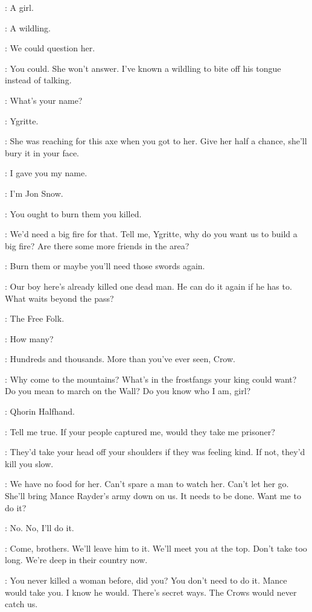 \JON: A girl. 

\HALFHAND: A wildling. 

\JON: We could question her. 

\HALFHAND: You could. She won't answer. I've known a wildling to bite off his tongue instead of talking. 

\JON: What's your name? 

\YGRITTE: Ygritte. 

\HALFHAND: She was reaching for this axe when you got to her. Give her half a chance, she'll bury it in your face. 

\YGRITTE: I gave you my name. 

\JON: I'm Jon Snow. 

\YGRITTE: You ought to burn them you killed. 

\HALFHAND: We'd need a big fire for that. Tell me, Ygritte, why do you want us to build a big fire? Are there some more friends in the area? 

\YGRITTE: Burn them or maybe you'll need those swords again. 

\HALFHAND: Our boy here's already killed one dead man. He can do it again if he has to. What waits beyond the pass? 

\YGRITTE: The Free Folk. 

\HALFHAND: How many? 

\YGRITTE: Hundreds and thousands. More than you've ever seen, Crow. 

\HALFHAND: Why come to the mountains? What's in the frostfangs your king could want? Do you mean to march on the Wall? Do you know who I am, girl? 

\YGRITTE: Qhorin Halfhand. 

\HALFHAND: Tell me true. If your people captured me, would they take me prisoner? 

\YGRITTE: They'd take your head off your shoulders if they was feeling kind. If not, they'd kill you slow. 

\HALFHAND: We have no food for her. Can't spare a man to watch her. Can't let her go. She'll bring Mance Rayder's army down on us. It needs to be done. Want me to do it? 

\JON: No. No, I'll do it. 

\HALFHAND: Come, brothers. We'll leave him to it. We'll meet you at the top. Don't take too long. We're deep in their country now. 


\YGRITTE: You never killed a woman before, did you? You don't need to do it. Mance would take you. I know he would. There's secret ways. The Crows would never catch us. 

